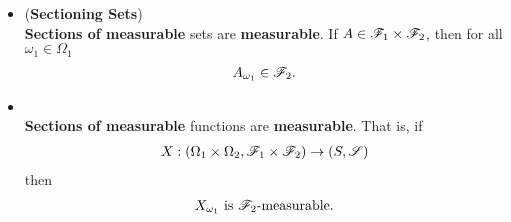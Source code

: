 \documentclass[11pt]{article}
\begin{document}
\begin{itemize}
\item \begin{lemma} (\textbf{Sectioning Sets}) \citep{resnick2013probability}\\
\textbf{Sections of measurable} sets are \textbf{measurable}. If $A \in {\mathscr F}_{1}\times {\mathscr F}_{2}$, then for all $\omega_1 \in \Omega_1$
\begin{align*}
A_{\omega_1} \in {\mathscr F}_2.
\end{align*}
\end{lemma}

\item \begin{corollary}  \citep{resnick2013probability}\\
\textbf{Sections of measurable} functions are \textbf{measurable}. That is, if
\begin{align*}
X: (\Omega_{1}\times \Omega_{2}, {\mathscr F}_{1}\times {\mathscr F}_{2}) \rightarrow (S, {\mathscr S})
\end{align*}
then
\begin{align*}
X_{\omega_1} \text{ is }{\mathscr F}_2\text{-measurable.}
\end{align*}
\end{corollary}
\end{itemize}
\end{document}
